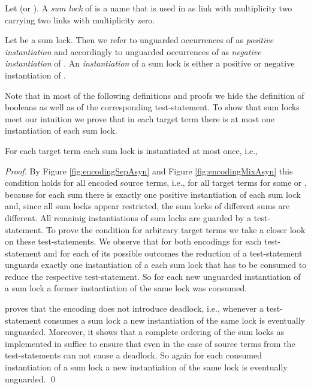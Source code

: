 \documentclass[]{llncs}
\begin{document}
\begin{definition} \label{def:sumLock}
	Let  (or ). A \emph{sum lock} of  is a name  that is used in  as link with multiplicity two carrying two links with multiplicity zero.
	
	Let  be a sum lock. Then we refer to unguarded occurrences of  as \emph{positive instantiation} and accordingly to unguarded occurrences of  as \emph{negative instantiation} of . An \emph{instantiation} of a sum lock  is either a positive or negative instantiation of .
\end{definition}

Note that in most of the following definitions and proofs we hide the definition of booleans as well as of the corresponding test-statement. To show that sum locks meet our intuition we prove that in each target term  there is at most one instantiation of each sum lock.

\begin{lemma} \label{lem:instantiationSumLocks}
	For each target term each sum lock is instantiated at most once, i.e.,
	
\end{lemma}

\begin{proof}
	By Figure \ref{fig:encodingSepAsyn} and Figure \ref{fig:encodingMixAsyn} this condition holds for all encoded source terms, i.e., for all target terms  for some  or , because for each sum there is exactly one positive instantiation of each sum lock and, since all sum locks appear restricted, the sum locks of different sums are different. All remainig instantiations of sum locks are guarded by a test-statement. To prove the condition for arbitrary target terms we take a closer look on these test-statements. We observe that for both encodings for each test-statement and for each of its possible outcomes the reduction of a test-statement unguards exactly one instantiation of a each sum lock that has to be consumed to reduce the respective test-statement. So for each new unguarded instantiation of a sum lock a former instantiation of the same lock was consumed.
	
	 \cite{nestmann00} proves that the encoding  does not introduce deadlock, i.e., whenever a test-statement consumes a sum lock a new instantiation of the same lock is eventually unguarded. Moreover, it shows that a complete ordering of the sum locks as implemented in  suffice to ensure that even in the case of source terms from  the test-statements can not cause a deadlock. So again for each consumed instantiation of a sum lock a new instantiation of the same lock is eventually unguarded.
	\qed
\end{proof}
\end{document}
